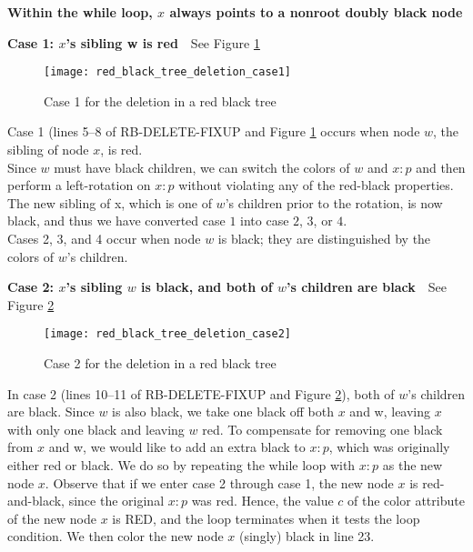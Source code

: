 \documentclass{article}
\begin{document}
\textbf{Within the while loop, $x$ always points to a nonroot doubly black node}

\textbf{Case 1: $x$'s sibling w is red}\ \ See Figure \ref{fig.rbt.deletion.case1}\\
\begin{figure}[htbp]
  \centering
  \texttt{[image: red\_black\_tree\_deletion\_case1]}\\
  \caption{Case 1 for the deletion in a red black tree}\label{fig.rbt.deletion.case1}
\end{figure}
Case 1 (lines 5–8 of RB-DELETE-FIXUP and Figure \ref{fig.rbt.deletion.case1} occurs when node $w$, the sibling of node $x$, is red. \\
Since $w$ must have black children, we can switch the colors of $w$ and $x:p$ and then perform a left-rotation on $x:p$ without violating any of the red-black properties. The new sibling of x, which is one of $w$'s children prior to the rotation, is now black, and thus we have converted case $1$ into case $2$, $3$, or $4$.\\
Cases 2, 3, and 4 occur when node $w$ is black; they are distinguished by the colors of $w$'s children.

\textbf{Case 2: $x$'s sibling $w$ is black, and both of $w$'s children are black}\ \ See Figure \ref{fig.rbt.deletion.case2}\\
\begin{figure}[htbp]
  \centering
  \texttt{[image: red\_black\_tree\_deletion\_case2]}\\
  \caption{Case 2 for the deletion in a red black tree}\label{fig.rbt.deletion.case2}
\end{figure}
In case 2 (lines 10–11 of RB-DELETE-FIXUP and Figure \ref{fig.rbt.deletion.case2}), both of $w$'s children are black. Since $w$ is also black, we take one black off both $x$ and w, leaving $x$ with only one black and leaving $w$ red. To compensate for removing one black from $x$ and w, we would like to add an extra black to $x:p$, which was originally either red or black. We do so by repeating the while loop with $x:p$ as the new node $x$. Observe that if we enter case 2 through case 1, the new node $x$ is red-and-black, since the original $x:p$ was red. Hence, the value $c$ of the color attribute of the new node $x$ is RED, and the loop terminates when it tests the loop condition. We then color the new node $x$ (singly) black in line 23.
\end{document}
